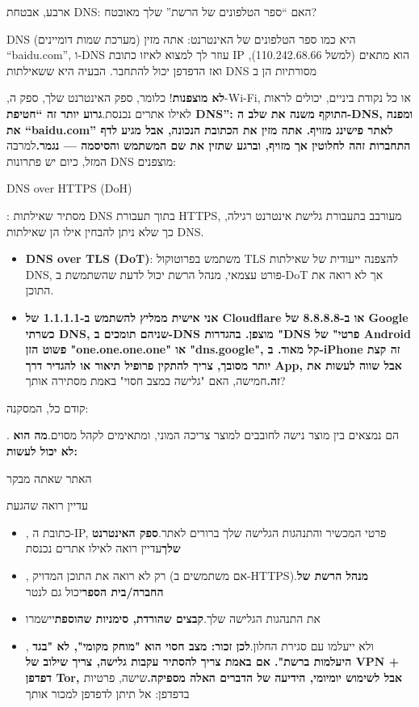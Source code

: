ארבע, אבטחת DNS: האם “ספר הטלפונים של הרשת” שלך מאובטח?

DNS (מערכת שמות דומיינים) היא כמו ספר הטלפונים של האינטרנט: אתה מזין “baidu.com”, ו-DNS עוזר לך למצוא לאיזו כתובת IP הוא מתאים (למשל 110.242.68.66), ואז הדפדפן יכול להתחבר. הבעיה היא ששאילתות DNS מסורתיות הן ב


,\textbf{לא מוצפנות}! כלומר, ספק האינטרנט שלך, ספק ה-Wi-Fi, או כל נקודת ביניים, יכולים לראות לאילו אתרים נכנסת.\textbf{גרוע יותר זה “חטיפת DNS”: התוקף משנה את שלב ה-DNS, ומפנה את “baidu.com” לאתר פישינג מזויף. אתה מזין את הכתובת הנכונה, אבל מגיע לדף התחברות זהה לחלוטין אך מזויף, וברגע שתזין את שם המשתמש והסיסמה — נגמר.}למרבה המזל, כיום יש פתרונות DNS מוצפנים:

DNS over HTTPS (DoH)

: מסתיר שאילתות DNS בתוך תעבורת HTTPS, מעורבב בתעבורת גלישת אינטרנט רגילה, כך שלא ניתן להבחין אילו הן שאילתות DNS.

\begin{itemize}
  \item \textbf{DNS over TLS (DoT)}: משתמש בפרוטוקול TLS להצפנה ייעודית של שאילתות DNS, פורט עצמאי, מנהל הרשת יכול לדעת שהשתמשת ב-DoT אך לא רואה את התוכן.
  \item \textbf{אני אישית ממליץ להשתמש ב-1.1.1.1 של Cloudflare או ב-8.8.8.8 של Google כשרתי DNS, שניהם תומכים ב-DNS מוצפן. בהגדרות "DNS פרטי" של Android פשוט הזן "one.one.one.one" או "dns.google", קל מאוד. ב-iPhone זה קצת יותר מסובך, צריך להתקין פרופיל תיאור או להגדיר דרך App, אבל שווה לעשות את זה.}חמישה, האם "גלישה במצב חסוי" באמת מסתירה אותך?
\end{itemize}

קודם כל, המסקנה:


. הם נמצאים בין מוצר נישה לחובבים למוצר צריכה המוני, ומתאימים לקהל מסוים.\textbf{מה הוא לא יכול לעשות:}

האתר שאתה מבקר

עדיין רואה שהגעת

\begin{itemize}
  \item , כתובת ה-IP, פרטי המכשיר והתנהגות הגלישה שלך ברורים לאתר.\textbf{ספק האינטרנט שלך}עדיין רואה לאילו אתרים נכנסת
  \item , רק לא רואה את התוכן המדויק (אם משתמשים ב-HTTPS).\textbf{מנהל הרשת של החברה/בית הספר}יכול גם לנטר
  \item את התנהגות הגלישה שלך.\textbf{קבצים שהורדת, סימניות שהוספת}יישמרו
  \item , ולא ייעלמו עם סגירת החלון.\textbf{לכן זכור: מצב חסוי הוא "מוחק מקומי", לא "בגד היעלמות ברשת". אם באמת צריך להסתיר עקבות גלישה, צריך שילוב של VPN + דפדפן Tor, אבל לשימוש יומיומי, הידיעה של הדברים האלה מספיקה.}שישה, פרטיות בדפדפן: אל תיתן לדפדפן למכור אותך
\end{itemize}

